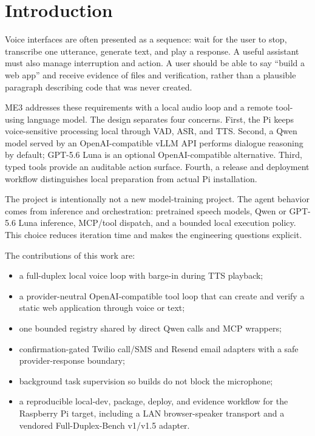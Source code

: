 \documentclass[sigconf,nonacm]{acmart}
\begin{document}

\maketitle

\section{Introduction}

Voice interfaces are often presented as a sequence: wait for the user to stop,
transcribe one utterance, generate text, and play a response. A useful
assistant must also manage interruption and action. A user should be able to
say ``build a web app'' and receive evidence of files and verification, rather
than a plausible paragraph describing code that was never created.

ME3 addresses these requirements with a local audio loop and a remote tool-using
language model. The design separates four concerns. First, the Pi keeps
voice-sensitive processing local through VAD, ASR, and TTS. Second, a Qwen
model served by an OpenAI-compatible vLLM API performs dialogue reasoning by
default; GPT-5.6 Luna is an optional OpenAI-compatible alternative.
Third, typed tools provide an auditable action surface. Fourth, a release and
deployment workflow distinguishes local preparation from actual Pi installation.

The project is intentionally not a new model-training project. The agent
behavior comes from inference and orchestration: pretrained speech models,
Qwen or GPT-5.6 Luna inference, MCP/tool dispatch, and a bounded local execution policy. This
choice reduces iteration time and makes the engineering questions explicit.

The contributions of this work are:
\begin{itemize}[leftmargin=*]
\item a full-duplex local voice loop with barge-in during TTS playback;
\item a provider-neutral OpenAI-compatible tool loop that can create and verify
a static web application through voice or text;
\item one bounded registry shared by direct Qwen calls and MCP wrappers;
\item confirmation-gated Twilio call/SMS and Resend email adapters with a
safe provider-response boundary;
\item background task supervision so builds do not block the microphone;
\item a reproducible local-dev, package, deploy, and evidence workflow for the
Raspberry Pi target, including a LAN browser-speaker transport and a vendored
Full-Duplex-Bench v1/v1.5 adapter.
\end{itemize}
\end{document}
